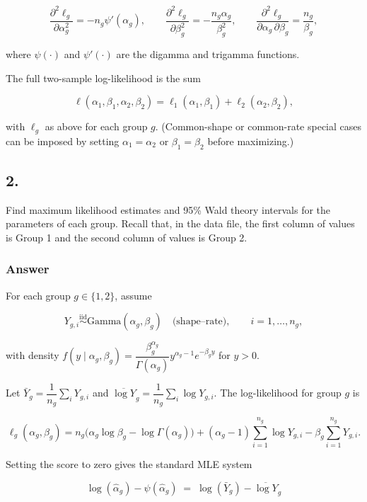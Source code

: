 \documentclass[
]{article}
\begin{document}
\[
\frac{\partial^2 \ell_g}{\partial \alpha_g^2}
= -n_g \psi'(\alpha_g),\qquad
\frac{\partial^2 \ell_g}{\partial \beta_g^2}
= -\frac{n_g\alpha_g}{\beta_g^2},\qquad
\frac{\partial^2 \ell_g}{\partial \alpha_g\,\partial \beta_g}
=\frac{n_g}{\beta_g},
\]

where \(\psi(\cdot)\) and \(\psi'(\cdot)\) are the digamma and trigamma
functions.

\newpage

The full two-sample log-likelihood is the sum

\[
\ell(\alpha_1,\beta_1,\alpha_2,\beta_2)
= \ell_1(\alpha_1,\beta_1)+\ell_2(\alpha_2,\beta_2),
\]

with \(\ell_g\) as above for each group \(g\). (Common-shape or
common-rate special cases can be imposed by setting
\(\alpha_1=\alpha_2\) or \(\beta_1=\beta_2\) before maximizing.)

\newpage

\subsection{2.}\label{section-1}

Find maximum likelihood estimates and 95\% Wald theory intervals for the
parameters of each group. Recall that, in the data file, the first
column of values is Group 1 and the second column of values is Group 2.

\subsubsection{Answer}\label{answer-1}

For each group \(g\in\{1,2\}\), assume

\[
Y_{g,i}\stackrel{\text{iid}}{\sim}\mathrm{Gamma}(\alpha_g,\beta_g)\quad\text{(shape–rate)},
\qquad i=1,\dots,n_g,
\]

with density
\(f(y\mid\alpha_g,\beta_g)=\dfrac{\beta_g^{\alpha_g}}{\Gamma(\alpha_g)}y^{\alpha_g-1}e^{-\beta_g y}\)
for \(y>0\).

Let \(\bar Y_g=\dfrac{1}{n_g}\sum_i Y_{g,i}\) and
\(\overline{\log Y}_g=\dfrac{1}{n_g}\sum_i \log Y_{g,i}\). The
log-likelihood for group \(g\) is

\[
\ell_g(\alpha_g,\beta_g)
= n_g\big(\alpha_g\log\beta_g-\log\Gamma(\alpha_g)\big)
 +(\alpha_g-1)\sum_{i=1}^{n_g}\log Y_{g,i}
 -\beta_g\sum_{i=1}^{n_g}Y_{g,i}.
\]

Setting the score to zero gives the standard MLE system

\[
\log(\hat\alpha_g)-\psi(\hat\alpha_g)\;=\;\log(\bar Y_g)-\overline{\log Y}_g
\]
\end{document}
